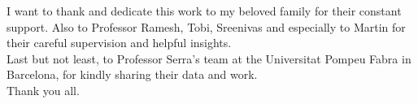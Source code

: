 I want to thank and dedicate this work to my beloved family for their constant support. Also to Professor Ramesh, Tobi, Sreenivas and especially to Martin for their careful supervision and helpful insights.\\

Last but not least, to Professor Serra's team at the Universitat Pompeu Fabra in Barcelona, for kindly sharing their data and work.\\

Thank you all.
